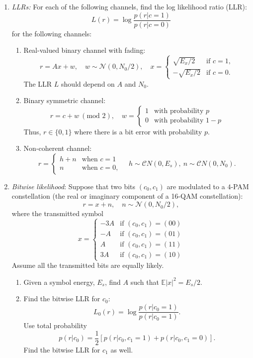\documentclass[11pt]{article}
\def\Exp{\mathbb{E}}
\begin{document}
\begin{enumerate}
\item \emph{LLRs:}  For each of the following channels, find the log likelihood ratio (LLR):
\[
    L(r) = \log \frac{ p(r|c=1) }{ p(r|c=0) }
\]
for the following channels:
\begin{enumerate}[label=(\alph*)]
\item Real-valued binary channel with fading:
\[
    r= Ax + w, \quad w \sim {\mathcal N}(0,N_0/2), \quad
        x = \begin{cases}
         \sqrt{E_x/2} & \mbox{if } c = 1, \\
        -\sqrt{E_x/2} & \mbox{if } c = 0.
    \end{cases}
\]
The LLR $L$ should depend on $A$ and $N_0$.

\item Binary symmetric channel:
\[
    r = c + w ~(\mbox{mod } 2), \quad w =
        \begin{cases}
        1 & \mbox{with probability } p \\
        0 & \mbox{with probability } 1-p
        \end{cases}
\]
Thus, $r \in \{0,1\}$ where there is a bit error with probability $p$.

\item Non-coherent channel:
\[
    r = \begin{cases}
        h + n & \mbox{when } c = 1\\
        n  & \mbox{when } c = 0,
        \end{cases}
        \quad h \sim {\mathcal CN}(0,E_s), ~n\sim {\mathcal CN}(0,N_0).
\]

\end{enumerate}

\item \emph{Bitwise likelihood}:  Suppose that two bits $(c_0,c_1)$ are modulated to
a $4$-PAM constellation
(the real or imaginary component of a 16-QAM constellation):
\[
    r = x + n, \quad n \sim {\mathcal N}(0,N_0/2),
\]
where the transmitted symbol
\[
    x = \begin{cases}
        -3A & \mbox{if } (c_0,c_1) = (00) \\
         -A & \mbox{if } (c_0,c_1) = (01) \\
          A & \mbox{if } (c_0,c_1) = (11) \\
         3A & \mbox{if } (c_0,c_1) = (10)
         \end{cases}
\]
Assume all the transmitted bits are equally likely.
\begin{enumerate}[label=(\alph*)]
\item Given a symbol energy, $E_s$, find $A$ such that $\Exp|x|^2 = E_s/2$.
\item Find the bitwise LLR for $c_0$:
\[
    L_0(r) = \log \frac{p(r|c_0=1)}{p(r|c_0=1)}.
\]
Use total probability
\[
    p(r|c_0) = \frac{1}{2}\left[ p(r|c_0,c_1=1) + p(r|c_0,c_1=0) \right].
\]
Find the bitwise LLR for $c_1$ as well.
\end{enumerate}


\end{enumerate}
\end{document}

